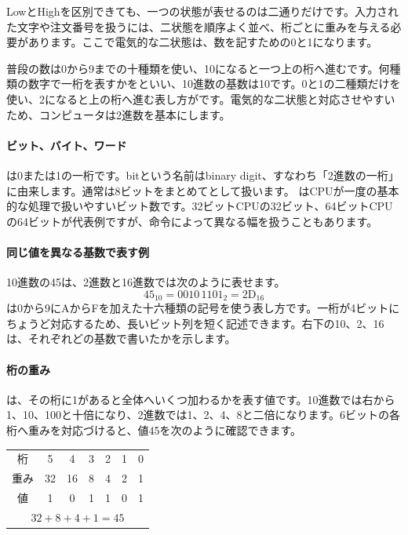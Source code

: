 LowとHighを区別できても、一つの状態が表せるのは二通りだけです。入力された文字や注文番号を扱うには、二状態を順序よく並べ、桁ごとに重みを与える必要があります。ここで電気的な二状態は、数を記すための0と1になります。

普段の数は0から9までの十種類を使い、10になると一つ上の桁へ進むです。何種類の数字で一桁を表すかをといい、10進数の基数は10です。0と1の二種類だけを使い、2になると上の桁へ進む表し方がです。電気的な二状態と対応させやすいため、コンピュータは2進数を基本にします。

\begingroup
\begingroup
\paragraph{ビット、バイト、ワード}
        は0または1の一桁です。bitという名前はbinary digit、すなわち「2進数の一桁」に由来します。通常は8ビットをまとめてとして扱います。
        はCPUが一度の基本的な処理で扱いやすいビット数です。32ビットCPUの32ビット、64ビットCPUの64ビットが代表例ですが、命令によって異なる幅を扱うこともあります。

\paragraph{同じ値を異なる基数で表す例}
        10進数の45は、2進数と16進数では次のように表せます。
        \[
          45_{10}=0010\,1101_2=2\mathrm{D}_{16}
        \]
        は0から9にAからFを加えた十六種類の記号を使う表し方です。一桁が4ビットにちょうど対応するため、長いビット列を短く記述できます。右下の10、2、16は、それぞれどの基数で書いたかを示します。

\par
\endgroup
\medskip
\begingroup
\begin{samepage}
\paragraph{桁の重み}
        は、その桁に1があると全体へいくつ加わるかを表す値です。10進数では右から1、10、100と十倍になり、2進数では1、2、4、8と二倍になります。6ビットの各桁へ重みを対応づけると、値45を次のように確認できます。
        \par\smallskip
        \begin{center}
        \begin{tabular}{c@{\quad}c@{\quad}c@{\quad}c@{\quad}c@{\quad}c@{\quad}c}
          桁 & 5 & 4 & 3 & 2 & 1 & 0\\
          重み & 32 & 16 & 8 & 4 & 2 & 1\\
          値 & 1 & 0 & 1 & 1 & 0 & 1\\
          \bottomrule
          \multicolumn{7}{c}{$32+8+4+1=45$}
        \end{tabular}
        \end{center}
\end{samepage}

